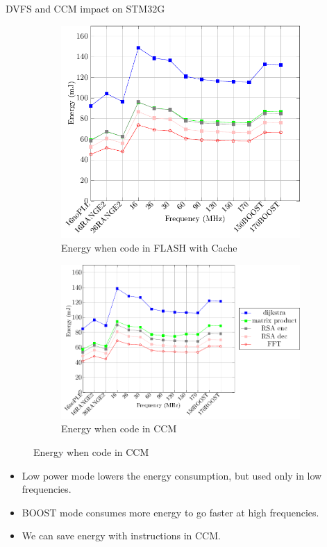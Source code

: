 \documentclass[
	11pt, %
]{beamer}
\begin{document}
\begin{frame}{DVFS and CCM impact on STM32G}
	\begin{figure}
		\begin{subfigure}{0.4\textwidth}
			\includegraphics[scale = 0.4]{data/stm32g_v2/abs/abs_energy_flash_32g.pdf}
			\caption{Energy when code in FLASH with Cache}
		\end{subfigure}
		\begin{subfigure}{0.4\textwidth}
			\includegraphics[scale = 0.4]{data/stm32g_v2/abs/abs_energy_ccm.pdf}
			\caption{Energy when code in CCM}
		\end{subfigure}
	\end{figure}
	\begin{itemize}
		\item Low power mode lowers the energy consumption, but used only in low frequencies.
		\item BOOST mode consumes more energy to go faster at high frequencies. 
		\item We can save energy with instructions in CCM.
	\end{itemize}
\end{frame}
\end{document}
